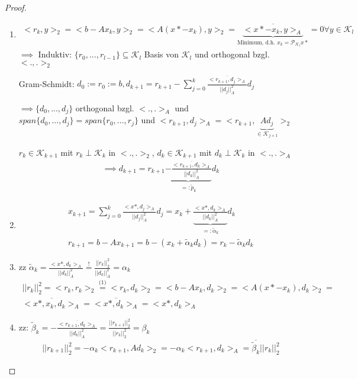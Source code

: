 \begin{proof}
	\begin{enumerate}
		\item \begin{align*}
			<r_k, y>_2 = <b - Ax_k, y>_2 = <A(x* - x_k), y>_2 = \underbrace{\overline{<x* - x_k, y>_A}}_{\text{Minimum, d.h. } x_k = \mathcal{P}_{\mathcal{K}_l}x*} = 0 \forall y \in \mathcal{K}_l
		\end{align*}
		$\implies$ Induktiv: $\{r_0, ..., r_{l-1}\} \subseteq \mathcal{K}_l$ Basis von $\mathcal{K}_l$ und orthogonal bzgl. $<., .>_2$ \checkmark
		
		Gram-Schmidt: $d_0 := r_0 := b, d_{k+1} = r_{k+1} - \sum_{j=0}^{k} \frac{\overline{<r_{k+1}, d_j>_A}}{||d_j||_A^2} d_j$
		
		$\implies \{d_0, ..., d_j\}$ orthogonal bzgl. $<., .>_A$ und $span\{d_0, ..., d_j\} = span\{r_0, ..., r_j\}$ und $<r_{k+1}, d_j>_A = <r_{k+1}, \underbrace{Ad_j}_{\in \mathcal{K}_{j+1}}>_2$
		
		$r_k \in \mathcal{K}_{k+1}$ mit $r_k \perp \mathcal{K}_k$ in $<., .>_2$, $d_k \in \mathcal{K}_{k+1}$ mit $d_k \perp \mathcal{K}_k$ in $<., .>_A$
		\begin{align*}
			\implies d_{k+1} = r_{k+1} \underbrace{- \frac{\overline{<r_{k+1}, d_k>_A}}{||d_k||_A^2}}_{=: \tilde{p}_k} d_k
		\end{align*}
		
		\item \begin{align*}
			x_{k+1} = \sum_{j=0}^{k} \frac{<x*, d_j>_A}{||d_j||_A^2} d_j = x_k + \underbrace{\frac{<x*, d_k>_A}{||d_k||_A^2}}_{=: \tilde{\alpha}_k} d_k\\
			r_{k+1} = b - Ax_{k+1} = b - (x_k + \tilde{\alpha}_k d_k) = r_k - \tilde{\alpha}_k d_k
		\end{align*}
		
		\item zz $\tilde{\alpha}_k = \frac{<x*, d_k>_A}{||d_k||_A^2} \overset{!}{=} \frac{||r_k||_2^2}{||d_k||_A^2} = \alpha_k$
		\begin{align*}
			||r_k||_2^2 = <r_k, r_k>_2 \overset{\text{(1)}}{=} <r_k, d_k>_2 = <b-Ax_k, d_k>_2 =
			<A(x* - x_k), d_k>_2 =\\
			\overline{<x*, x_k, d_k>_A} = \overline{<x*, d_k>_A} = <x*, d_k>_A
		\end{align*}
		
		\item zz: $\tilde{\beta}_k = - \frac{\overline{<r_{k+1}, d_k>_A}}{||d_k||_A^2} = \frac{||r_{k+1}||_2^2}{||r_k||_2^2} = \beta_k$
		\begin{align*}
			||r_{k+1}||_2^2 = - \alpha_k <r_{k+1}, Ad_k>_2 = - \alpha_k <r_{k+1}, d_k>_A = \overline{\tilde{\beta}_k} ||r_k||_2^2
		\end{align*}
	\end{enumerate}
\end{proof}

